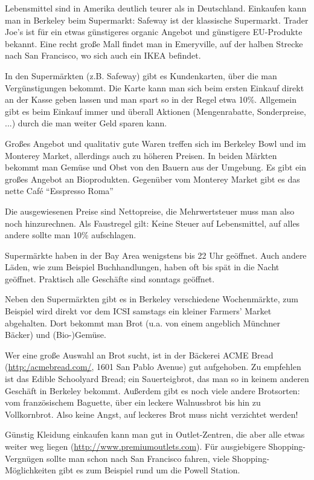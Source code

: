 \documentclass[a4paper]{scrreprt}
\begin{document}
Lebensmittel sind in Amerika deutlich teurer als in
Deutschland. Einkaufen kann man in Berkeley beim Supermarkt: Safeway
ist der klassische Supermarkt. Trader Joe's ist für ein etwas
günstigeres organic Angebot und günstigere EU-Produkte bekannt. Eine
recht große Mall findet man in Emeryville, auf der halben Strecke nach
San Francisco, wo sich auch ein IKEA befindet. 

In den Supermärkten (z.B. Safeway) gibt es Kundenkarten, über die man
Vergünstigungen bekommt. Die Karte kann man sich beim ersten Einkauf
direkt an der Kasse geben lassen und man spart so in der Regel etwa
10\%. Allgemein gibt es beim Einkauf immer und überall Aktionen
(Mengenrabatte, Sonderpreise, ...) durch die man weiter Geld sparen
kann. 

Großes Angebot und qualitativ gute Waren treffen sich im Berkeley Bowl
und im Monterey Market, allerdings auch zu höheren Preisen. In beiden
Märkten bekommt man Gemüse und Obst von den Bauern aus der
Umgebung. Es gibt ein großes Angebot an Bioprodukten. Gegenüber vom
Monterey Market gibt es das nette Café ``Esspresso Roma''

Die ausgewiesenen Preise sind Nettopreise, die Mehrwertsteuer muss man
also noch hinzurechnen. Als Faustregel gilt: Keine Steuer auf
Lebensmittel, auf alles andere sollte man 10\% aufschlagen.

Supermärkte haben in der Bay Area wenigstens bis 22 Uhr geöffnet. Auch
andere Läden, wie zum Beispiel Buchhandlungen, haben oft bis spät in
die Nacht geöffnet. Praktisch alle Geschäfte sind sonntags geöffnet.

Neben den Supermärkten gibt es in Berkeley verschiedene Wochenmärkte,
zum Beispiel wird direkt vor dem ICSI samstags ein kleiner Farmers'
Market abgehalten. Dort bekommt man Brot (u.a. von einem angeblich
Münchner Bäcker) und (Bio-)Gemüse. %

Wer eine große Auswahl an Brot sucht, ist in der Bäckerei ACME Bread
(\url{http:/acmebread.com/}, 1601 San Pablo Avenue) gut aufgehoben. Zu
empfehlen ist das Edible Schoolyard Bread; ein Sauerteigbrot, das man
so in keinem anderen Geschäft in Berkeley bekommt. Außerdem gibt es
noch viele andere Brotsorten: vom französischem Baguette, über ein
leckere Walnussbrot bis hin zu Vollkornbrot. Also keine Angst, auf
leckeres Brot muss nicht verzichtet werden! 

Günstig Kleidung einkaufen kann man gut in Outlet-Zentren, die aber
alle etwas weiter weg liegen
(\url{http://www.premiumoutlets.com}). Für ausgiebigere
Shopping-Vergnügen sollte man schon nach San Francisco fahren, viele
Shopping-Möglichkeiten gibt es zum Beispiel rund um die Powell
Station.
\end{document}
